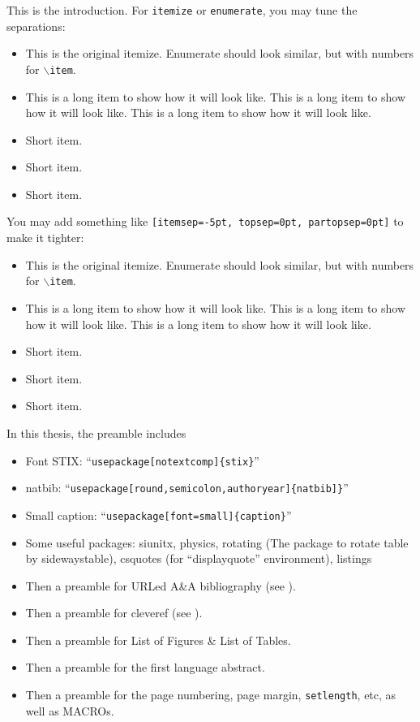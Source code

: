 This is the introduction. For \texttt{itemize} or \texttt{enumerate}, you may tune the separations:
\begin{itemize}
\item This is the original itemize. Enumerate should look similar, but with numbers for \texttt{$\backslash$item}.
\item This is a long item to show how it will look like. This is a long item to show how it will look like. This is a long item to show how it will look like.
\item Short item.
\item Short item.
\item Short item.
\end{itemize}

You may add something like \texttt{[itemsep=-5pt, topsep=0pt, partopsep=0pt]} to make it tighter:
\begin{itemize}[itemsep=-5pt, topsep=0pt, partopsep=0pt]
\item This is the original itemize. Enumerate should look similar, but with numbers for \texttt{$\backslash$item}.
\item This is a long item to show how it will look like. This is a long item to show how it will look like. This is a long item to show how it will look like.
\item Short item.
\item Short item.
\item Short item.
\end{itemize}

In this thesis, the preamble includes
\begin{itemize}[itemsep=-5pt, topsep=0pt, partopsep=0pt]
\item Font STIX: ``\texttt{usepackage[notextcomp]\{stix\}}''
\item natbib: ``\texttt{usepackage[round,semicolon,authoryear]\{natbib]\}}''
\item Small caption: ``\texttt{usepackage[font=small]\{caption\}}''
\item Some useful packages: siunitx, physics, rotating (The package to rotate table by sidewaystable), csquotes (for ``displayquote'' environment), listings
\item Then a preamble for URLed A\&A bibliography (see ).
\item Then a preamble for cleveref (see ).
\item Then a preamble for List of Figures \& List of Tables.
\item Then a preamble for the first language abstract.
\item Then a preamble for the page numbering, page margin, \texttt{setlength}, etc, as well as MACROs.
\end{itemize}
